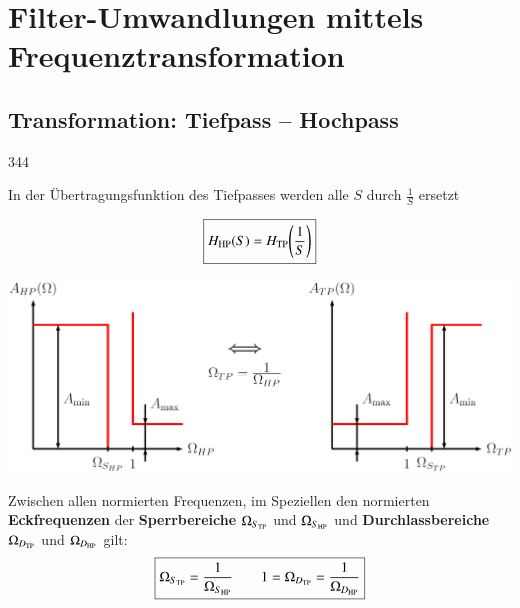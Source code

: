 
\section{Filter-Umwandlungen mittels Frequenztransformation}
\label{Frequenztransformation}

\subsection{Transformation: Tiefpass -- Hochpass}{344}

In der Übertragungsfunktion des Tiefpasses werden alle $S$ durch $\frac{1}{S}$ ersetzt

\begin{minipage}[c]{0.4\columnwidth}
    $$ \boxed{H_{\rm HP}(S) = H_{\rm TP} \Bigg(\frac{1}{S} \Bigg) } $$
\end{minipage}
\hfill
\begin{minipage}[c]{0.58\columnwidth}
    \includegraphics[width=\columnwidth]{images/toleranzschema_HP_TP.png}
\end{minipage}

\vspace{0.2cm}
Zwischen allen normierten Frequenzen, im Speziellen den normierten \textbf{Eckfrequenzen} der \textbf{Sperrbereiche}
$\Omega_{S_{\rm TP}}$ und $\Omega_{S_{\rm HP}}$ und \textbf{Durchlassbereiche} $\Omega_{D_{\rm TP}}$ und $\Omega_{D_{\rm HP}}$ gilt:
$$ \boxed{ \Omega_{S_{\rm TP}} = \frac{1}{\Omega_{S_{\rm HP}}}  \qquad 1 = \Omega_{D_{\rm TP}} = \frac{1}{\Omega_{D_{\rm HP}}} } $$


